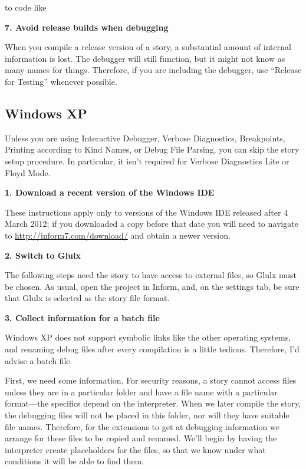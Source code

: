 \documentclass{book}
\newcommand{\lastpagebreak}{\vfill\pagebreak}
\begin{document}
to code like

\begin{quote}
  
\end{quote}

\textbf{7. Avoid release builds when debugging}

When you compile a release version of a story, a substantial amount of internal
information is lost.  The debugger will still function, but it might not know as
many names for things.  Therefore, if you are including the debugger, use
``Release for Testing'' whenever possible.

\lastpagebreak

\subsection{Windows XP}

Unless you are using Interactive Debugger, Verbose Diagnostics, Breakpoints,
Printing according to Kind Names, or Debug File Parsing, you can skip the story
setup procedure.  In particular, it isn't required for Verbose Diagnostics Lite
or Floyd Mode.

\textbf{1. Download a recent version of the Windows IDE}

These instructions apply only to versions of the Windows IDE released after 4
March 2012; if you downloaded a copy before that date you will need to navigate
to \url{http://inform7.com/download/} and obtain a newer version.

\textbf{2. Switch to Glulx}

The following steps need the story to have access to external files, so Glulx
must be chosen.  As usual, open the project in Inform, and, on the settings tab,
be sure that Glulx is selected as the story file format.

\textbf{3. Collect information for a batch file}

Windows XP does not support symbolic links like the other operating systems, and
renaming debug files after every compilation is a little tedious.  Therefore,
I'd advise a batch file.

First, we need some information.  For security reasons, a story cannot access
files unless they are in a particular folder and have a file name with a
particular format---the specifics depend on the interpreter.  When we later
compile the story, the debugging files will not be placed in this folder, nor
will they have suitable file names.  Therefore, for the extensions to get at
debugging information we arrange for these files to be copied and renamed.
We'll begin by having the interpreter create placeholders for the files, so that
we know under what conditions it will be able to find them.
\end{document}
